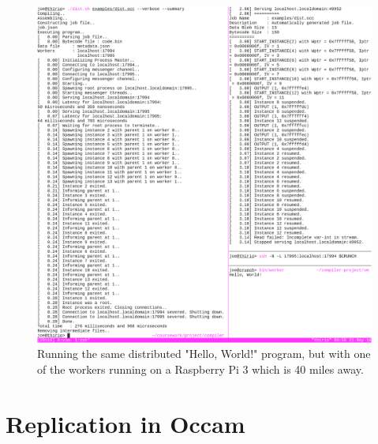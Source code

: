 \documentclass[12pt, twoside]{report}
\begin{document}
    \begin{figure}[H]
      \includegraphics[width=\textwidth]{images/distributed_pi}
      \caption{
        Running the same distributed "Hello, World!" program, but with one of
        the workers running on a Raspberry Pi 3 which is 40 miles away.
      }
    \end{figure}
  
  \chapter{Replication in Occam} \label{adx-occam}
    

    \printglossaries

    
\end{document}
